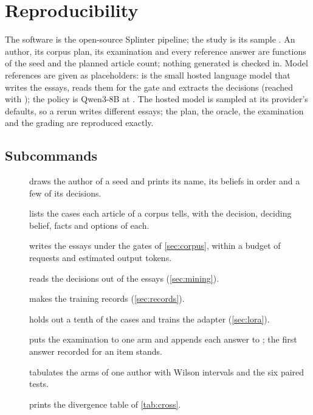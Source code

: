 
\section{Reproducibility}\label{sec:reproducibility}

The software is the open-source Splinter pipeline; the study is its sample
. An author, its corpus plan, its examination and every
reference answer are functions of the seed and the planned article count; nothing generated
is checked in. Model references are given as placeholders:  is the small
hosted language model that writes the essays, reads them for the gate and extracts the
decisions (reached with ); the policy is Qwen3-8B at .
The hosted model is sampled at its provider's defaults, so a rerun writes different essays;
the plan, the oracle, the examination and the grading are reproduced exactly.

\subsection{Subcommands}

\begin{description}
\item[] draws the author of a seed and prints its name, its beliefs in order and a few of its decisions.
\item[] lists the cases each article of a corpus tells, with the decision, deciding
  belief, facts and options of each.
\item[] writes the essays under the gates of \cref{sec:corpus}, within a budget of
  requests and estimated output tokens.
\item[] reads the decisions out of the essays (\cref{sec:mining}).
\item[] makes the training records (\cref{sec:records}).
\item[] holds out a tenth of the cases and trains the adapter (\cref{sec:lora}).
\item[] puts the examination to one arm and appends each answer to
  ; the first answer recorded for an item stands.
\item[] tabulates the arms of one author with Wilson intervals and the six paired
  tests.
\item[] prints the divergence table of \cref{tab:cross}.
\end{description}

